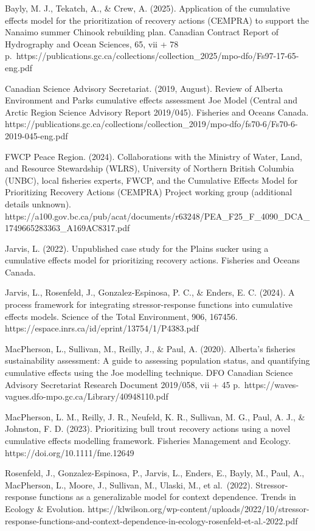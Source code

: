 \documentclass[
  letterpaper,
  DIV=11,
  numbers=noendperiod]{scrreprt}
\begin{document}
Bayly, M. J., Tekatch, A., \& Crew, A. (2025). Application of the
cumulative effects model for the prioritization of recovery actions
(CEMPRA) to support the Nanaimo summer Chinook rebuilding plan. Canadian
Contract Report of Hydrography and Ocean Sciences, 65, vii + 78
p.~https://publications.gc.ca/collections/collection\_2025/mpo-dfo/Fs97-17-65-eng.pdf

Canadian Science Advisory Secretariat. (2019, August). Review of Alberta
Environment and Parks cumulative effects assessment Joe Model (Central
and Arctic Region Science Advisory Report 2019/045). Fisheries and
Oceans Canada.
https://publications.gc.ca/collections/collection\_2019/mpo-dfo/fs70-6/Fs70-6-2019-045-eng.pdf

FWCP Peace Region. (2024). Collaborations with the Ministry of Water,
Land, and Resource Stewardship (WLRS), University of Northern British
Columbia (UNBC), local fisheries experts, FWCP, and the Cumulative
Effects Model for Prioritizing Recovery Actions (CEMPRA) Project working
group (additional details unknown).
https://a100.gov.bc.ca/pub/acat/documents/r63248/PEA\_F25\_F\_4090\_DCA\_1749665283363\_A169AC8317.pdf

Jarvis, L. (2022). Unpublished case study for the Plains sucker using a
cumulative effects model for prioritizing recovery actions. Fisheries
and Oceans Canada.

Jarvis, L., Rosenfeld, J., Gonzalez-Espinosa, P. C., \& Enders, E. C.
(2024). A process framework for integrating stressor-response functions
into cumulative effects models. Science of the Total Environment, 906,
167456. https://espace.inrs.ca/id/eprint/13754/1/P4383.pdf

MacPherson, L., Sullivan, M., Reilly, J., \& Paul, A. (2020). Alberta's
fisheries sustainability assessment: A guide to assessing population
status, and quantifying cumulative effects using the Joe modelling
technique. DFO Canadian Science Advisory Secretariat Research Document
2019/058, vii + 45
p.~https://waves-vagues.dfo-mpo.gc.ca/Library/40948110.pdf

MacPherson, L. M., Reilly, J. R., Neufeld, K. R., Sullivan, M. G., Paul,
A. J., \& Johnston, F. D. (2023). Prioritizing bull trout recovery
actions using a novel cumulative effects modelling framework. Fisheries
Management and Ecology. https://doi.org/10.1111/fme.12649

Rosenfeld, J., Gonzalez-Espinosa, P., Jarvis, L., Enders, E., Bayly, M.,
Paul, A., MacPherson, L., Moore, J., Sullivan, M., Ulaski, M., et
al.~(2022). Stressor-response functions as a generalizable model for
context dependence. Trends in Ecology \& Evolution.
https://klwilson.org/wp-content/uploads/2022/10/stressor-response-functions-and-context-dependence-in-ecology-rosenfeld-et-al.-2022.pdf
\end{document}
